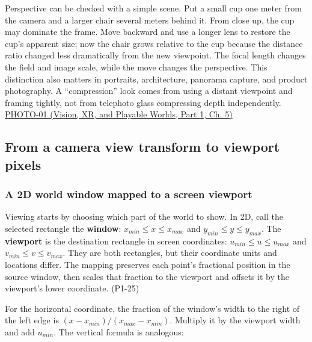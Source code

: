 Perspective can be checked with a simple scene. Put a small cup one meter from the camera and a larger chair several meters behind it. From close up, the cup may dominate the frame. Move backward and use a longer lens to restore the cup's apparent size; now the chair grows relative to the cup because the distance ratio changed less dramatically from the new viewpoint. The focal length changes the field and image scale, while the move changes the perspective. This distinction also matters in portraits, architecture, panorama capture, and product photography. A ``compression'' look comes from using a distant viewpoint and framing tightly, not from telephoto glass compressing depth independently. \href{../07-Vision-XR-and-Playable-Worlds-P01/main.pdf\#nameddest=04-visual-computing-ii-ch036-photo-01---photography-session-01}{PHOTO-01 (Vision, XR, and Playable Worlds, Part 1, Ch. 5)}

\subsection{From a camera view transform to viewport pixels}\label{03-visual-computing-i-ch003-from-a-camera-view-transform-to-viewport-pixels}

\hypertarget{03-visual-computing-i-ch003-from-a-camera-view-transform-to-viewport-pixels}{}

\subsubsection{A 2D world window mapped to a screen viewport}\label{03-visual-computing-i-ch003-a-2d-world-window-mapped-to-a-screen-viewport}

\hypertarget{03-visual-computing-i-ch003-a-2d-world-window-mapped-to-a-screen-viewport}{}

Viewing starts by choosing which part of the world to show. In 2D, call the selected rectangle the \textbf{window}: \(x_{min}\leq x\leq x_{max}\) and \(y_{min}\leq y\leq y_{max}\). The \textbf{viewport} is the destination rectangle in screen coordinates: \(u_{min}\leq u\leq u_{max}\) and \(v_{min}\leq v\leq v_{max}\). They are both rectangles, but their coordinate units and locations differ. The mapping preserves each point's fractional position in the source window, then scales that fraction to the viewport and offsets it by the viewport's lower coordinate. (P1-25)

For the horizontal coordinate, the fraction of the window's width to the right of the left edge is \((x-x_{min})/(x_{max}-x_{min})\). Multiply it by the viewport width and add \(u_{min}\). The vertical formula is analogous:


